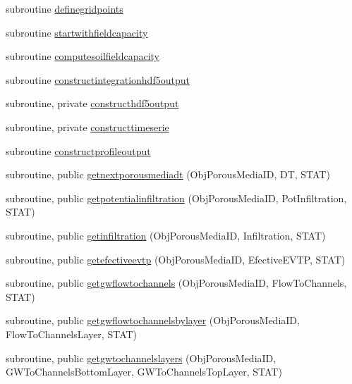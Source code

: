 \begin{DoxyCompactItemize}
subroutine \mbox{\hyperlink{namespacemoduleporousmedia_a85940000a15a4caa7221748c12a655c6}{definegridpoints}}
\item 
subroutine \mbox{\hyperlink{namespacemoduleporousmedia_af2c381d3df927d5f0eb263a6fe3b13a7}{startwithfieldcapacity}}
\item 
subroutine \mbox{\hyperlink{namespacemoduleporousmedia_a5bc710495ce11815ae382078999351b3}{computesoilfieldcapacity}}
\item 
subroutine \mbox{\hyperlink{namespacemoduleporousmedia_ad4d7e80e82397566cbd292b6c16a78f8}{constructintegrationhdf5output}}
\item 
subroutine, private \mbox{\hyperlink{namespacemoduleporousmedia_a222cfa7f29b1db2fb4ab637f6c27c28e}{constructhdf5output}}
\item 
subroutine, private \mbox{\hyperlink{namespacemoduleporousmedia_adba23be00c82f6436627807a223113c5}{constructtimeserie}}
\item 
subroutine \mbox{\hyperlink{namespacemoduleporousmedia_a4c55632f6a1d6b5ff5769ca1ae4a1f74}{constructprofileoutput}}
\item 
subroutine, public \mbox{\hyperlink{namespacemoduleporousmedia_a97ffb3238bf0364c7e0c3e30fe5b7021}{getnextporousmediadt}} (Obj\+Porous\+Media\+ID, DT, S\+T\+AT)
\item 
subroutine, public \mbox{\hyperlink{namespacemoduleporousmedia_aa235c3281ca1f6104396eec860cafc63}{getpotentialinfiltration}} (Obj\+Porous\+Media\+ID, Pot\+Infiltration, S\+T\+AT)
\item 
subroutine, public \mbox{\hyperlink{namespacemoduleporousmedia_ad1bd34c459069a631831974e49b7bb8c}{getinfiltration}} (Obj\+Porous\+Media\+ID, Infiltration, S\+T\+AT)
\item 
subroutine, public \mbox{\hyperlink{namespacemoduleporousmedia_a2706d0d1284873eb1538b17e9b347d9a}{getefectiveevtp}} (Obj\+Porous\+Media\+ID, Efective\+E\+V\+TP, S\+T\+AT)
\item 
subroutine, public \mbox{\hyperlink{namespacemoduleporousmedia_a59f51d54f2a02220e661022657f0435a}{getgwflowtochannels}} (Obj\+Porous\+Media\+ID, Flow\+To\+Channels, S\+T\+AT)
\item 
subroutine, public \mbox{\hyperlink{namespacemoduleporousmedia_a3e1fc1f7f447b7f85698caff9d4810c7}{getgwflowtochannelsbylayer}} (Obj\+Porous\+Media\+ID, Flow\+To\+Channels\+Layer, S\+T\+AT)
\item 
subroutine, public \mbox{\hyperlink{namespacemoduleporousmedia_a742d19854f8590b5db164ac97052d8c3}{getgwtochannelslayers}} (Obj\+Porous\+Media\+ID, G\+W\+To\+Channels\+Bottom\+Layer, G\+W\+To\+Channels\+Top\+Layer, S\+T\+AT)

\end{DoxyCompactItemize}
